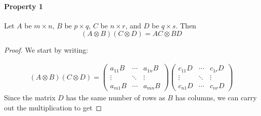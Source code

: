\documentclass[a4paper,12pt]{scrartcl}
\begin{document}
\paragraph{Property 1} Let $A$ be $m\times n$, $B$ be $p \times q$,
$C$ be $n\times r$, and $D$ be $q \times s$. Then
\begin{equation}
    (A \otimes B)(C \otimes D) = AC \otimes BD
\end{equation}
\begin{proof} We start by writing:

\begin{align*}
    (A \otimes B)(C \otimes D) = 
    \begin{pmatrix} a_{11} B & \cdots & a_{1n} B \\
	\vdots & \ddots & \vdots \\
	a_{m1} B & \cdots & a_{mn}B \end{pmatrix}
    \begin{pmatrix} c_{11} D & \cdots & c_{1r} D \\
	\vdots & \ddots & \vdots \\
	c_{n1} D & \cdots & c_{nr}D \end{pmatrix}
\end{align*}
Since the matrix $D$ has the same number of rows as $B$ has columns,
we can carry out the multiplication to get

\end{proof}
\end{document}
